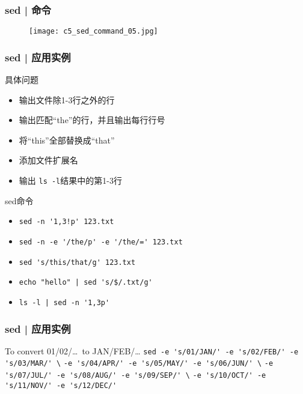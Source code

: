 \begin{frame}
  \frametitle{sed | 命令}
  \begin{figure}
    \centering
    \texttt{[image: c5\_sed\_command\_05.jpg]}
  \end{figure}
\end{frame}

\begin{frame}[fragile]
  \frametitle{sed | \alert{应用实例}}
  \begin{block}{具体问题}
    \begin{itemize}
      \item<2-> 输出文件除1-3行之外的行 
      \item<4-> 输出匹配“the”的行，并且输出每行行号
      \item<6-> 将“this”全部替换成“that”
      \item<8-> 添加文件扩展名
      \item<10-> 输出 \verb|ls -l|结果中的第1-3行
    \end{itemize}
  \end{block}
  \begin{block}{sed命令}
    \begin{itemize}
      \item<3-> \verb|sed -n '1,3!p' 123.txt|
      \item<5-> \verb|sed -n -e '/the/p' -e '/the/=' 123.txt|
      \item<7-> \verb|sed 's/this/that/g' 123.txt|
      \item<9-> \verb=echo "hello" | sed 's/$/.txt/g'=
      \item<11-> \verb=ls -l | sed -n '1,3p'=
    \end{itemize}
  \end{block}
\end{frame}

\begin{frame}[fragile]
  \frametitle{sed | 应用实例}
  \begin{block}{To convert 01/02/\ldots \ to JAN/FEB/\ldots}
    \verb|sed -e 's/01/JAN/' -e 's/02/FEB/' -e 's/03/MAR/' \|
    \verb|-e 's/04/APR/' -e 's/05/MAY/' -e 's/06/JUN/' \|
    \verb|-e 's/07/JUL/' -e 's/08/AUG/' -e 's/09/SEP/' \|
    \verb|-e 's/10/OCT/' -e 's/11/NOV/' -e 's/12/DEC/'|
  \end{block}
\end{frame}

